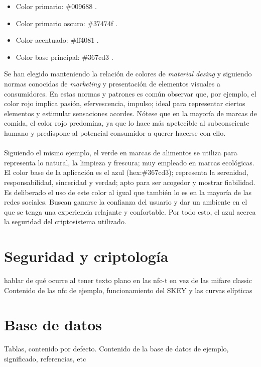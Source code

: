 \documentclass[../PFC.tex]{subfiles}
\begin{document}
\begin{itemize}
\item{Color primario: \#009688 .}
\item{Color primario oscuro: \#37474f .}
\item{Color acentuado: \#ff4081 .}
\item{Color base principal: \#367cd3 .}
\end{itemize}

Se han elegido manteniendo la relación de colores de \textit{material desing} y siguiendo normas conocidas de \textit{marketing} y presentación de elementos visuales a consumidores. En estas normas y patrones es común observar que, por ejemplo, el color rojo implica pasión, efervescencia, impulso; ideal para representar ciertos elementos y estimular sensaciones acordes. Nótese que en la mayoría de marcas de comida, el color rojo predomina, ya que lo hace más apetecible al subconsciente humano y predispone al potencial consumidor a querer hacerse con ello. 
\\\\
Siguiendo el mismo ejemplo, el verde en marcas de alimentos se utiliza para representa lo natural, la limpieza y frescura; muy empleado en marcas ecológicas. El color base de la aplicación es el azul (hex:\#367cd3); representa la serenidad, responsabilidad, sinceridad y verdad; apto para ser acogedor y mostrar fiabilidad. Es deliberado el uso de este color al igual que también lo es en la mayoría de las redes sociales. Buscan ganarse la confianza del usuario y dar un ambiente en el que se tenga una experiencia relajante y confortable. Por todo esto, el azul acerca la seguridad del criptosistema utilizado.

\section{Seguridad y criptología}
\label{App:Seguridad y criptología}

hablar de qué ocurre al tener texto plano en las nfc-t en vez de las mifare classic
Contenido de las nfc de ejemplo, funcionamiento del SKEY y las curvas elípticas

\section{Base de datos}
\label{App:Base de datos}

Tablas, contenido por defecto.
Contenido de la base de datos de ejemplo, significado, referencias, etc
\end{document}
